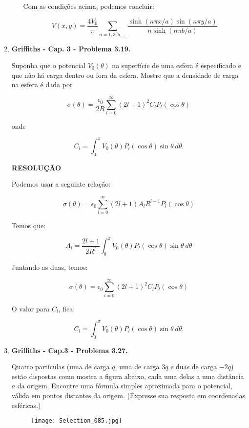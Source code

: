 \documentclass[11pt,a4paper]{article}
\begin{document}
\begin{enumerate}
\begin{enumerate}
Com as condições acima, podemos concluir:

$$V(x,y) = \displaystyle\dfrac{4V_0}{\pi}\displaystyle\sum_{n=1,3,5,...}\displaystyle\dfrac{\sinh(n\pi x/a) \sin(n\pi y/a)}{n \sinh(n\pi b/a)}$$

\end{enumerate}

\item \textbf{Griffiths - Cap. 3 - Problema 3.19.}

Suponha que o potencial $V_0(\theta)$ na superfície de uma esfera é especificado e que não há carga dentro ou fora da esfera. Mostre que a densidade de carga na esfera é dada por

$$\sigma (\theta) = \displaystyle\dfrac{\epsilon_0}{2R} \displaystyle\sum_{l=0}^\infty (2l + 1)^2 C_l P_l (\cos \theta)$$

onde 

$$C_l = \displaystyle\int_0^\pi V_0(\theta) P_l (\cos \theta) \sin \theta \ d\theta.$$

\textbf{RESOLUÇÃO}

Podemos usar a seguinte relação:

$$\sigma (\theta) = \epsilon_0 \displaystyle\sum_{l=0}^\infty (2l + 1) A_l R^{l-1} P_l (\cos \theta)$$

Temos que:

$$A_l = \displaystyle\dfrac{2l + 1}{2R^l} \displaystyle\int_0^\pi V_0(\theta) P_l (\cos \theta) \sin \theta \ d\theta$$

Juntando as duas, temos:

$$\sigma (\theta) = \epsilon_0 \displaystyle\sum_{l=0}^\infty (2l + 1)^2 C_l P_l (\cos \theta)$$

O valor para $C_l$, fica:

$$C_l = \displaystyle\int_0^\pi V_0(\theta) P_l (\cos \theta) \sin \theta \ d\theta.$$

\item \textbf{Griffiths - Cap.3 - Problema 3.27.}

Quatro partículas (uma de carga $q$, uma de carga $3q$ e duas de carga $-2q$) estão dispostas como mostra a figura abaixo, cada uma delas a uma distância $a$ da origem. Encontre uma fórmula simples aproximada para o potencial, válida em pontos distantes da origem. (Expresse sua resposta em coordenadas esféricas.)

\begin{figure}[h]	
\centering %
\texttt{[image: Selection\_085.jpg]} 
\end{figure}


\end{enumerate}
\end{document}
